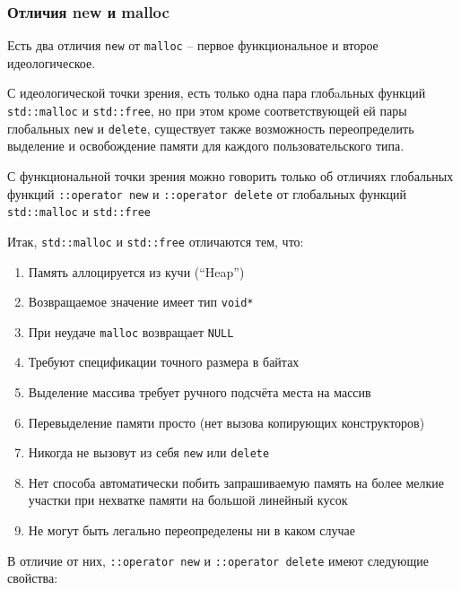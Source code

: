 \documentclass[a4paper,12pt,oneside]{article}
\begin{document}
\subsubsection{Отличия new и malloc}\label{NewMalloc}

Есть два отличия \lstinline!new! от \lstinline!malloc! -- первое функциональное и второе идеологическое. 

С идеологической точки зрения, есть только одна пара глобaльных функций \lstinline!std::malloc! и \lstinline!std::free!, но при этом кроме соответствующей ей пары глобальных \lstinline!new! и \lstinline!delete!, существует также возможность переопределить выделение и освобождение памяти для каждого пользовательского типа.

С функциональной точки зрения можно говорить только об отличиях глобальных функций \lstinline!::operator new! и \lstinline!::operator delete! от глобальных функций \lstinline!std::malloc! и \lstinline!std::free!

Итак, \lstinline!std::malloc! и \lstinline!std::free! отличаются тем, что:

\begin{enumerate}
\item
Память аллоцируется из кучи (``Heap'')
\item
Возвращаемое значение имеет тип \lstinline!void*!
\item
При неудаче \lstinline!malloc! возвращает \lstinline!NULL!
\item
Требуют спецификации точного размера в байтах
\item
Выделение массива требует ручного подсчёта места на массив
\item
Перевыделение памяти просто (нет вызова копирующих конструкторов)
\item
Никогда не вызовут из себя \lstinline!new! или \lstinline!delete!
\item
Нет способа автоматически побить запрашиваемую память на более мелкие участки при нехватке памяти на большой линейный кусок
\item
Не могут быть легально переопределены ни в каком случае
\end{enumerate}

В отличие от них, \lstinline!::operator new! и \lstinline!::operator delete! имеют следующие свойства:
\end{document}
